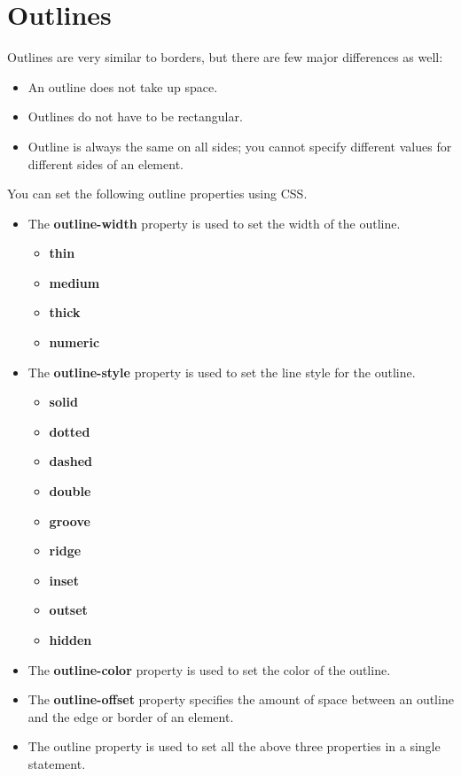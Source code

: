 \documentclass{report}
\begin{document}
    \section{\LARGE Outlines}
    \bigbreak \noindent 
    Outlines are very similar to borders, but there are few major differences as well:
    \begin{itemize}
        \item An outline does not take up space.
        \item Outlines do not have to be rectangular.
        \item Outline is always the same on all sides; you cannot specify different values for different sides of an element.
    \end{itemize}
    \bigbreak \noindent 
    You can set the following outline properties using CSS.
    \begin{itemize}
        \item The \textbf{outline-width} property is used to set the width of the outline.
            \begin{itemize}
                \item \textbf{thin}
                \item \textbf{medium}
                \item \textbf{thick}
                \item \textbf{numeric}
            \end{itemize}
        \item The \textbf{outline-style} property is used to set the line style for the outline.
            \begin{itemize}
                \item \textbf{solid}
                \item \textbf{dotted}
                \item \textbf{dashed}
                \item \textbf{double}
                \item \textbf{groove}
                \item \textbf{ridge}
                \item \textbf{inset}
                \item \textbf{outset}
                \item \textbf{hidden}
            \end{itemize}
        \item The \textbf{outline-color} property is used to set the color of the outline.
        \item The \textbf{outline-offset} property specifies the amount of space between an outline and the edge or border of an element. 
        \item The outline property is used to set all the above three properties in a single statement.
    \end{itemize}
\end{document}
